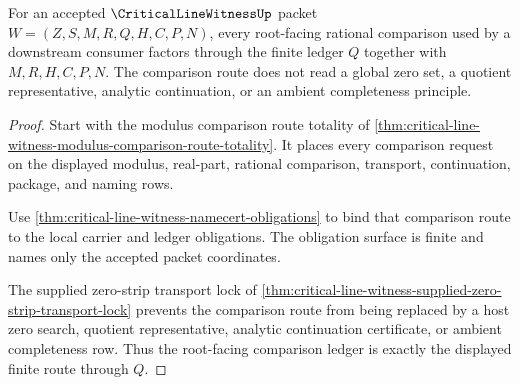 \begin{theorem}
\label{thm:critical-line-witness-root-comparison-ledger}
For an accepted $\CriticalLineWitnessUp$ packet $W=(Z,S,M,R,Q,H,C,P,N)$, every root-facing rational comparison used by a downstream consumer factors through the finite ledger $Q$ together with $M,R,H,C,P,N$. The comparison route does not read a global zero set, a quotient representative, analytic continuation, or an ambient completeness principle.
\end{theorem}
\begin{proof}
Start with the modulus comparison route totality of \autoref{thm:critical-line-witness-modulus-comparison-route-totality}. It places every comparison request on the displayed modulus, real-part, rational comparison, transport, continuation, package, and naming rows.

Use \autoref{thm:critical-line-witness-namecert-obligations} to bind that comparison route to the local carrier and ledger obligations. The obligation surface is finite and names only the accepted packet coordinates.

The supplied zero-strip transport lock of \autoref{thm:critical-line-witness-supplied-zero-strip-transport-lock} prevents the comparison route from being replaced by a host zero search, quotient representative, analytic continuation certificate, or ambient completeness row. Thus the root-facing comparison ledger is exactly the displayed finite route through $Q$.
\end{proof}

